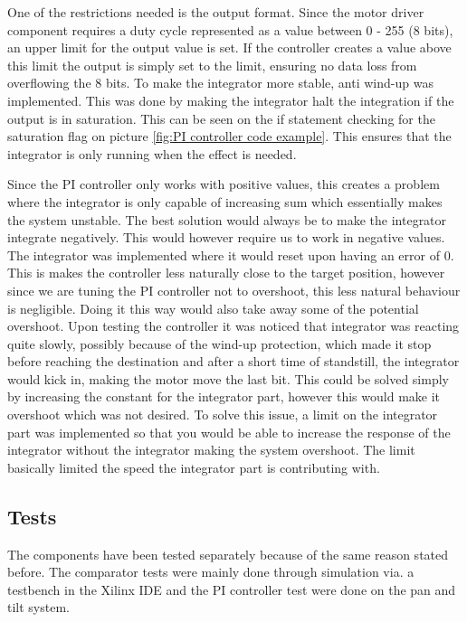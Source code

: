 One of the restrictions needed is the output format. Since the motor driver component requires a duty cycle represented as a value between 0 - 255 (8 bits), an upper limit for the output value is set. If the controller creates a value above this limit the output is simply set to the limit, ensuring no data loss from overflowing the 8 bits.
To make the integrator more stable, anti wind-up was implemented. This was done by making the integrator halt the integration if the output is in saturation. This can be seen on the if statement checking for the saturation flag on picture \ref{fig:PI controller code example}. This ensures that the integrator is only running when the effect is needed.

Since the PI controller only works with positive values, this creates a problem where the integrator is only capable of increasing sum which essentially makes the system unstable. The best solution would always be to make the integrator integrate negatively. This would however require us to work in negative values. The integrator was implemented where it would reset upon having an error of 0. This is makes the controller less naturally close to the target position, however since we are tuning the PI controller not to overshoot, this less natural behaviour is negligible. Doing it this way would also take away some of the potential overshoot.
Upon testing the controller it was noticed that integrator was reacting quite slowly, possibly because of the wind-up protection, which made it stop before reaching the destination and after a short time of standstill, the integrator would kick in, making the motor move the last bit. This could be solved simply by increasing the constant for the integrator part, however this would make it overshoot which was not desired. To solve this issue, a limit on the integrator part was implemented so that you would be able to increase the response of the integrator without the integrator making the system overshoot. The limit basically limited the speed the integrator part is contributing with.


\subsection{Tests}

The components have been tested separately because of the same reason stated before. The comparator tests were mainly done through simulation via. a testbench in the Xilinx IDE and the PI controller test were done on the pan and tilt system.


